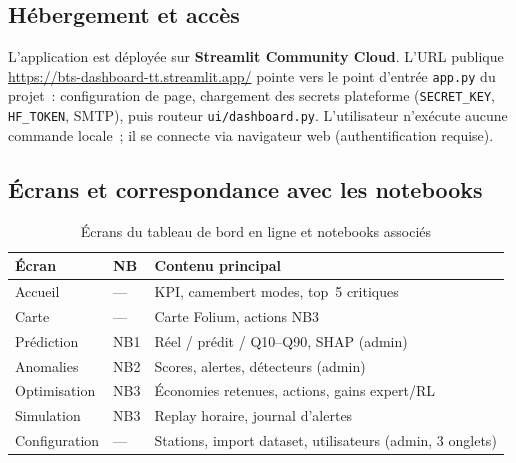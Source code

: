 \subsection{Hébergement et accès}
\label{subsec:dep-hebergement}

L'application est déployée sur \textbf{Streamlit Community Cloud}. L'URL
publique \url{https://bts-dashboard-tt.streamlit.app/} pointe vers le point
d'entrée \texttt{app.py} du projet~: configuration de page, chargement des
secrets plateforme (\texttt{SECRET\_KEY}, \texttt{HF\_TOKEN}, SMTP), puis
routeur \texttt{ui/dashboard.py}. L'utilisateur n'exécute aucune commande
locale~; il se connecte via navigateur web (authentification requise).


\subsection{Écrans et correspondance avec les notebooks}
\label{subsec:dep-ecrans}

\begin{table}[htbp]
  \centering
  \caption{Écrans du tableau de bord en ligne et notebooks associés}
  \label{tab:ecrans}
  \begin{tabular}{@{}p{2.6cm}p{1cm}p{9.2cm}@{}}
    \toprule
    \textbf{Écran} & \textbf{NB} & \textbf{Contenu principal} \\
    \midrule
    Accueil        & --- & KPI, camembert modes, top~5 critiques \\
    Carte          & --- & Carte Folium, actions NB3 \\
    Prédiction     & NB1 & Réel / prédit / Q10--Q90, SHAP (admin) \\
    Anomalies      & NB2 & Scores, alertes, détecteurs (admin) \\
    Optimisation   & NB3 & Économies retenues, actions, gains expert/RL \\
    Simulation     & NB3 & Replay horaire, journal d'alertes \\
    Configuration  & --- & Stations, import dataset, utilisateurs (admin, 3 onglets) \\
    \bottomrule
  \end{tabular}
\end{table}


